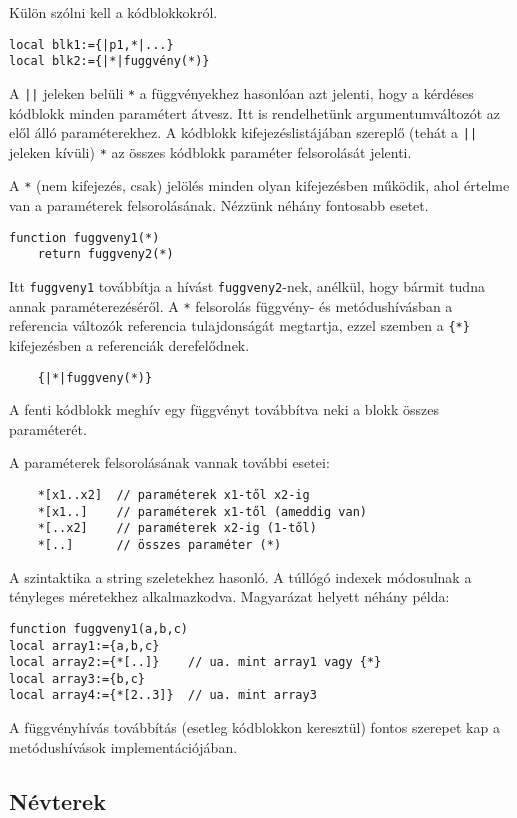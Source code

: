 Külön szólni kell a kódblokkokról.
\begin{verbatim}
local blk1:={|p1,*|...}
local blk2:={|*|fuggvény(*)}
\end{verbatim}
A \verb!||! jeleken belüli \verb!*! a függvényekhez hasonlóan azt jelenti, 
hogy a kérdéses kódblokk minden paramétert átvesz. Itt is rendelhetünk
argumentumváltozót az elől álló paraméterekhez. A kódblokk kifejezéslistájában
szereplő (tehát a \verb!||! jeleken kívüli) \verb!*! az összes kódblokk paraméter
felsorolását jelenti.


A \verb!*! (nem kifejezés, csak) jelölés
minden olyan kifejezésben működik, ahol értelme van a paraméterek
felsorolásának. Nézzünk néhány fontosabb esetet.
\begin{verbatim}
function fuggveny1(*)
    return fuggveny2(*)
\end{verbatim}
Itt \verb!fuggveny1! továbbítja a hívást \verb!fuggveny2!-nek, 
anélkül, hogy bármit tudna annak paraméterezéséről.
A \verb!*! felsorolás függvény- és metódushívásban a referencia változók
referencia tulajdonságát megtartja, ezzel szemben a \verb!{*}! kifejezésben 
a referenciák derefelődnek.

\begin{verbatim}
    {|*|fuggveny(*)}
\end{verbatim}
A fenti kódblokk meghív egy függvényt továbbítva neki a blokk összes paraméterét.



A paraméterek felsorolásának vannak további esetei:
\begin{verbatim}
    *[x1..x2]  // paraméterek x1-től x2-ig
    *[x1..]    // paraméterek x1-től (ameddig van)
    *[..x2]    // paraméterek x2-ig (1-től)
    *[..]      // összes paraméter (*)
\end{verbatim}
A szintaktika a string szeletekhez hasonló. 
A túllógó indexek módosulnak a tényleges méretekhez alkalmazkodva.
Magyarázat helyett néhány példa:
\begin{verbatim}
function fuggveny1(a,b,c)
local array1:={a,b,c}
local array2:={*[..]}    // ua. mint array1 vagy {*}
local array3:={b,c}
local array4:={*[2..3]}  // ua. mint array3
\end{verbatim}
A függvényhívás továbbítás (esetleg kódblokkon keresztül) fontos szerepet
kap a metódushívások implementációjában.



\subsection{Névterek}

